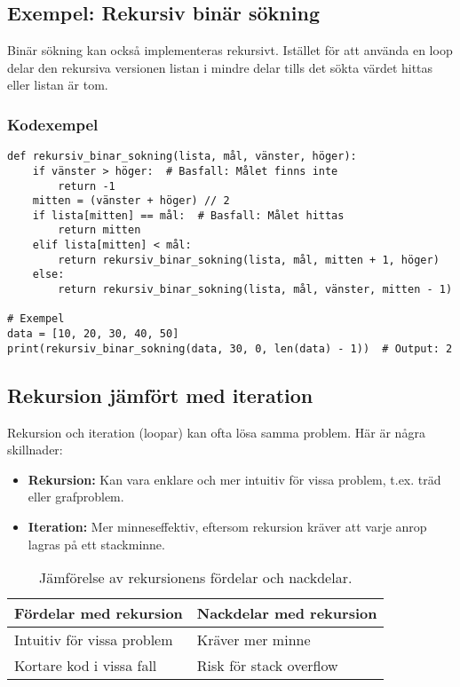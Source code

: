 \subsection{Exempel: Rekursiv binär sökning}
Binär sökning kan också implementeras rekursivt. Istället för att använda en loop delar den rekursiva versionen listan i mindre delar tills det sökta värdet hittas eller listan är tom.

\subsubsection*{Kodexempel}
\begin{lstlisting}[title=Rekursiv binär sökning]
def rekursiv_binar_sokning(lista, mål, vänster, höger):
    if vänster > höger:  # Basfall: Målet finns inte
        return -1
    mitten = (vänster + höger) // 2
    if lista[mitten] == mål:  # Basfall: Målet hittas
        return mitten
    elif lista[mitten] < mål:
        return rekursiv_binar_sokning(lista, mål, mitten + 1, höger)
    else:
        return rekursiv_binar_sokning(lista, mål, vänster, mitten - 1)

# Exempel
data = [10, 20, 30, 40, 50]
print(rekursiv_binar_sokning(data, 30, 0, len(data) - 1))  # Output: 2
\end{lstlisting}

\subsection{Rekursion jämfört med iteration}
Rekursion och iteration (loopar) kan ofta lösa samma problem. Här är några skillnader:
\begin{itemize}
    \item \textbf{Rekursion:} Kan vara enklare och mer intuitiv för vissa problem, t.ex. träd eller grafproblem.
    \item \textbf{Iteration:} Mer minneseffektiv, eftersom rekursion kräver att varje anrop lagras på ett stackminne.
\end{itemize}

\begin{table}[h!]
\centering
\begin{tabular}{|l|l|}
\hline
\textbf{Fördelar med rekursion} & \textbf{Nackdelar med rekursion} \\ \hline
Intuitiv för vissa problem      & Kräver mer minne                 \\ \hline
Kortare kod i vissa fall        & Risk för stack overflow          \\ \hline
\end{tabular}
\caption{Jämförelse av rekursionens fördelar och nackdelar.}
\end{table}

